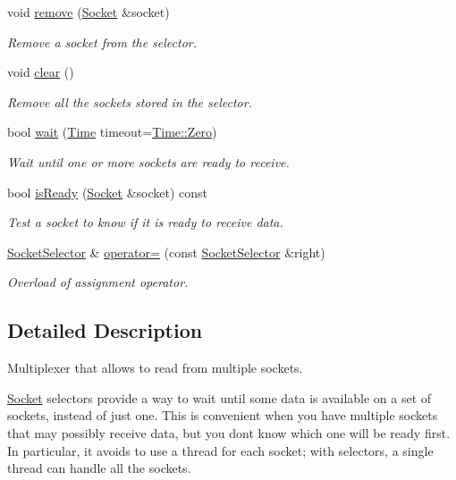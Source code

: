 \begin{DoxyCompactItemize}
void \hyperlink{classsf_1_1_socket_selector_a98b6ab693a65b82caa375639232357c1}{remove} (\hyperlink{classsf_1_1_socket}{Socket} \&socket)
\begin{DoxyCompactList}\small\item\em Remove a socket from the selector. \end{DoxyCompactList}\item 
void \hyperlink{classsf_1_1_socket_selector_a76e650acb0199d4be91e90a493fbc91a}{clear} ()
\begin{DoxyCompactList}\small\item\em Remove all the sockets stored in the selector. \end{DoxyCompactList}\item 
bool \hyperlink{classsf_1_1_socket_selector_a9cfda5475f17925e65889394d70af702}{wait} (\hyperlink{classsf_1_1_time}{Time} timeout=\hyperlink{classsf_1_1_time_a8db127b632fa8da21550e7282af11fa0}{Time\+::\+Zero})
\begin{DoxyCompactList}\small\item\em Wait until one or more sockets are ready to receive. \end{DoxyCompactList}\item 
bool \hyperlink{classsf_1_1_socket_selector_a917a4bac708290a6782e6686fd3bf889}{is\+Ready} (\hyperlink{classsf_1_1_socket}{Socket} \&socket) const
\begin{DoxyCompactList}\small\item\em Test a socket to know if it is ready to receive data. \end{DoxyCompactList}\item 
\hyperlink{classsf_1_1_socket_selector}{Socket\+Selector} \& \hyperlink{classsf_1_1_socket_selector_ae6395c7a8d29a9ea14939cc5d1ba3a33}{operator=} (const \hyperlink{classsf_1_1_socket_selector}{Socket\+Selector} \&right)
\begin{DoxyCompactList}\small\item\em Overload of assignment operator. \end{DoxyCompactList}\end{DoxyCompactItemize}


\subsection{Detailed Description}
Multiplexer that allows to read from multiple sockets. 

\hyperlink{classsf_1_1_socket}{Socket} selectors provide a way to wait until some data is available on a set of sockets, instead of just one. This is convenient when you have multiple sockets that may possibly receive data, but you don\textquotesingle{}t know which one will be ready first. In particular, it avoids to use a thread for each socket; with selectors, a single thread can handle all the sockets.

